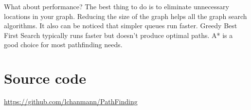 \documentclass[a4paper]{article}
\begin{document}
What about performance? The best thing to do is to eliminate unnecessary locations in your graph. Reducing the size of the graph helps all the graph search algorithms. It also can be noticed that simpler queues run faster. Greedy Best First Search typically runs faster but doesn’t produce optimal paths. A* is a good choice for most pathfinding needs. \\


\section{Source code}

\url{https://github.com/lchanmann/PathFinding}

\vfill




\nocite{*}




\end{document}

